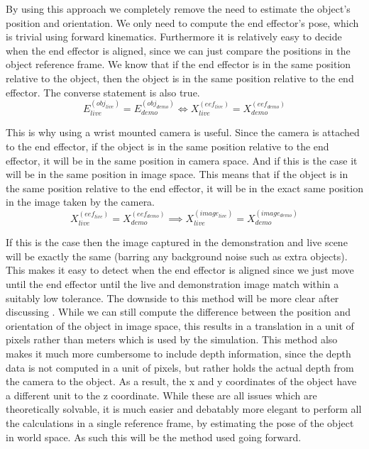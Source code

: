 By using this approach we completely remove the need to estimate the object's position and orientation. We only need to compute the end effector's pose, which is trivial using forward kinematics. Furthermore it is relatively easy to decide when the end effector is aligned, since we can just compare the positions in the object reference frame. We know that if the end effector is in the same position relative to the object, then the object is in the same position relative to the end effector. The converse statement is also true.
$$E_{live}^{(obj_{live})} = E_{demo}^{(obj_{demo})} \iff X_{live}^{(eef_{live})} = X_{demo}^{(eef_{demo})}$$

This is why using a wrist mounted camera is useful. Since the camera is attached to the end effector, if the object is in the same position relative to the end effector, it will be in the same position in camera space. And if this is the case it will be in the same position in image space. This means that if the object is in the same position relative to the end effector, it will be in the exact same position in the image taken by the camera.
$$X_{live}^{(eef_{live})} = X_{demo}^{(eef_{demo})} \implies X_{live}^{(image_{live})} = X_{demo}^{(image_{demo})}$$

If this is the case then the image captured in the demonstration and live scene will be exactly the same (barring any background noise such as extra objects). This makes it easy to detect when the end effector is aligned since we just move until the end effector until the live and demonstration image match within a suitably low tolerance. The downside to this method will be more clear after discussing . While we can still compute the difference between the position and orientation of the object in image space, this results in a translation in a unit of pixels rather than meters which is used by the simulation. This method also makes it much more cumbersome to include depth information, since the depth data is not computed in a unit of pixels, but rather holds the actual depth from the camera to the object. As a result, the x and y coordinates of the object have a different unit to the z coordinate. While these are all issues which are theoretically solvable, it is much easier and debatably more elegant to perform all the calculations in a single reference frame, by estimating the pose of the object in world space. As such this will be the method used going forward.


